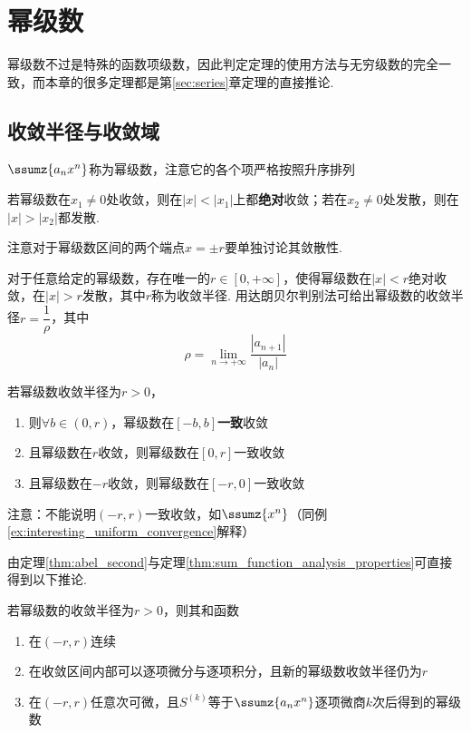 
\section{幂级数}
幂级数不过是特殊的函数项级数，因此判定定理的使用方法与无穷级数的完全一致，而本章的很多定理都是第\ref{sec:series}章定理的直接推论.
\subsection{收敛半径与收敛域}
\begin{definition}[幂级数]
$\ssumz{a_nx^n}$称为幂级数，注意它的各个项严格按照升序排列
\end{definition}
\begin{theorem}
若幂级数在$x_1\neq 0$处收敛，则在$|x|<|x_1|$上都\textbf{绝对}收敛；若在$x_2\neq 0$处发散，则在$|x|>|x_2|$都发散.
\end{theorem}
\par 注意对于幂级数区间的两个端点$x=\pm r$要单独讨论其敛散性.
\begin{definition}
对于任意给定的幂级数，存在唯一的$r\in[0,+\infty]$，使得幂级数在$|x|<r$绝对收敛，在$|x|>r$发散，其中$r$称为收敛半径. 用达朗贝尔判别法可给出幂级数的收敛半径$r=\dfrac{1}{\rho}$，其中
\[\rho=\lim_{n\to+\infty}\dfrac{|a_{n+1}|}{|a_n|}\]
\end{definition}
\begin{theorem}[阿贝尔第二定理]
\label{thm:abel_second}
若幂级数收敛半径为$r>0$，
\begin{enumerate}
	\item 则$\forall b\in(0,r)$，幂级数在$[-b,b]$\textbf{一致}收敛
	\item 且幂级数在$r$收敛，则幂级数在$[0,r]$一致收敛
	\item 且幂级数在$-r$收敛，则幂级数在$[-r,0]$一致收敛
\end{enumerate}
注意：不能说明$(-r,r)$一致收敛，如$\ssumz{x^n}$（同例\ref{ex:interesting_uniform_convergence}解释）
\end{theorem}
\par 由定理\ref{thm:abel_second}与定理\ref{thm:sum_function_analysis_properties}可直接得到以下推论.
\begin{corollary2}[幂级数和函数的分析性质]
若幂级数的收敛半径为$r>0$，则其和函数
\begin{enumerate}
	\item 在$(-r,r)$连续
	\item 在收敛区间内部可以逐项微分与逐项积分，且新的幂级数收敛半径仍为$r$
	\item 在$(-r,r)$任意次可微，且$S^{(k)}$等于$\ssumz{a_nx^n}$逐项微商$k$次后得到的幂级数
\end{enumerate}
\end{corollary2}

